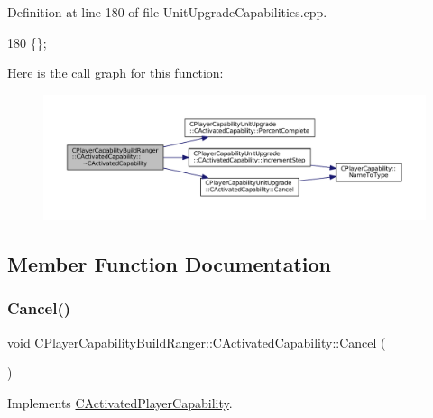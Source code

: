 Definition at line 180 of file Unit\+Upgrade\+Capabilities.\+cpp.


\begin{DoxyCode}
180 \{\};
\end{DoxyCode}
Here is the call graph for this function\+:\nopagebreak
\begin{figure}[H]
\begin{center}
\leavevmode
\includegraphics[width=350pt]{classCPlayerCapabilityBuildRanger_1_1CActivatedCapability_afd5d1ba5ad2b35faa67e4574627d46e1_cgraph}
\end{center}
\end{figure}


\subsection{Member Function Documentation}
\hypertarget{classCPlayerCapabilityBuildRanger_1_1CActivatedCapability_a46a5240502d6a8de65d3d56bbda8bf91}{}\label{classCPlayerCapabilityBuildRanger_1_1CActivatedCapability_a46a5240502d6a8de65d3d56bbda8bf91} 
\subsubsection{\texorpdfstring{Cancel()}{Cancel()}}
{\footnotesize\ttfamily void C\+Player\+Capability\+Build\+Ranger\+::\+C\+Activated\+Capability\+::\+Cancel (\begin{DoxyParamCaption}{ }\end{DoxyParamCaption})\hspace{0.3cm}{\ttfamily [virtual]}}



Implements \hyperlink{classCActivatedPlayerCapability_a5cde83be468e262ad054d81e28684a81}{C\+Activated\+Player\+Capability}.




